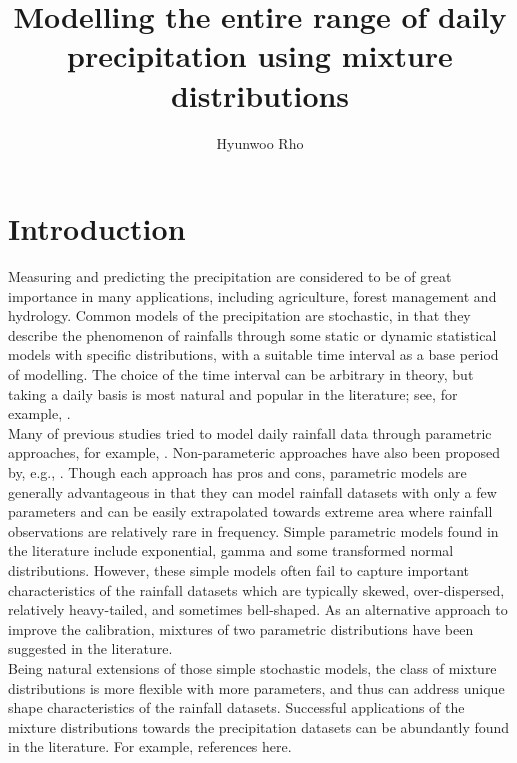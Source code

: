 \documentclass[12pt]{article}\usepackage[]{graphicx}\usepackage[]{color}
\newcommand{\cred}{ \color{red}}
\begin{document}
\title{Modelling the entire range of daily precipitation using mixture distributions}
\author{Hyunwoo Rho}
\date{}

\maketitle



\section{Introduction}


Measuring and predicting the precipitation are considered to be of great importance in many applications, including  agriculture, forest management and hydrology. Common models of  the precipitation are stochastic, in that they describe the phenomenon of rainfalls through some static or dynamic statistical models with specific distributions, with a suitable time interval as a base period of modelling. The choice of the time interval can be arbitrary in theory, but taking a daily basis is most natural and popular in the literature; see, for example, \cite{richardson1981stochastic}.\\

Many of previous studies tried to model daily rainfall data through parametric approaches, for example, \cite{ison1971wet, mielke1973three, richardson1981stochastic, stern1984model}. Non-parameteric approaches have also been proposed by, e.g., \cite{sharma1999nonparametric, harrold2003nonparametric}. Though each approach has pros and cons, parametric models are generally advantageous in that they can model rainfall datasets with only a few parameters and can be easily extrapolated towards extreme area where rainfall observations are relatively rare in frequency. Simple  parametric models found in the literature include exponential, gamma and some transformed normal distributions. However, these simple models often fail to capture important characteristics of the rainfall datasets which are typically skewed, over-dispersed, relatively heavy-tailed, and sometimes bell-shaped. As an alternative approach to improve the calibration, mixtures of two parametric distributions have been suggested in the literature. \\
 
Being natural extensions of those simple stochastic models, the class of mixture distributions is more flexible with more parameters, and thus can address unique shape characteristics of the rainfall datasets. Successful applications of the mixture distributions towards the precipitation datasets can be abundantly found in the literature. For example, {\cred references here.}\\
\vspace{2cm}
\end{document}
